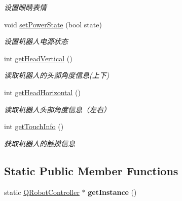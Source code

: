 \begin{DoxyCompactItemize}
\begin{DoxyCompactList}\small\item\em 设置眼睛表情 \end{DoxyCompactList}\item 
void \hyperlink{classQRobotController_abefa7bd9d04a9ab19471f6e91a44499b}{set\-Power\-State} (bool state)
\begin{DoxyCompactList}\small\item\em 设置机器人电源状态 \end{DoxyCompactList}\item 
int \hyperlink{classQRobotController_ad0d015342ff8552c99a24fbf32734f7a}{get\-Head\-Vertical} ()
\begin{DoxyCompactList}\small\item\em 读取机器人的头部角度信息(上下) \end{DoxyCompactList}\item 
int \hyperlink{classQRobotController_a7c42b64f401e74902cd207f6241d31bf}{get\-Head\-Horizontal} ()
\begin{DoxyCompactList}\small\item\em 读取机器人头部角度信息（左右） \end{DoxyCompactList}\item 
int \hyperlink{classQRobotController_ae92feceef6802284f5b6ba41cc43563a}{get\-Touch\-Info} ()
\begin{DoxyCompactList}\small\item\em 获取机器人的触摸信息 \end{DoxyCompactList}\end{DoxyCompactItemize}
\subsection*{\-Static \-Public \-Member \-Functions}
\begin{DoxyCompactItemize}
\item 
\hypertarget{classQRobotController_a191157dae5e55d42e29a10f3ad0bafed}{static \hyperlink{classQRobotController}{\-Q\-Robot\-Controller} $\ast$ {\bfseries get\-Instance} ()}\label{classQRobotController_a191157dae5e55d42e29a10f3ad0bafed}

\end{DoxyCompactItemize}


